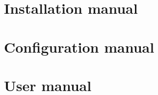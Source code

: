 \section{Installation manual}
\label{anexo_manual_instalacion}


\section{Configuration manual}
\label{anexo_manual_configuracion}


\section{User manual}
\label{anexo_manual_usuario}
